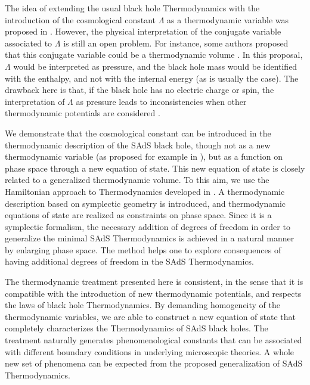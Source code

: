 \documentclass[prd,onecolumn,notitlepage,amsmath,nofootinbib,superscriptaddress,showpacs,showkeys]{revtex4-1}
\begin{document}
\newpage

The idea of extending the usual black hole Thermodynamics with the
introduction of the cosmological constant $\Lambda$ as a thermodynamic
variable was proposed in \cite{21,seki2006,29}. However, the physical
interpretation of the conjugate variable associated to $\Lambda$
is still an open problem. For instance, some authors proposed that
this conjugate variable could be a thermodynamic volume \cite{kastor2009,Dol1,2011}.
In this proposal, $\Lambda$ would be interpreted as pressure, and
the black hole mass would be identified with the enthalpy, and not
with the internal energy (as is usually the case). The drawback here
is that, if the black hole has no electric charge or spin, the interpretation
of $\Lambda$ as pressure leads to inconsistencies when other thermodynamic
potentials are considered \cite{seki2006,Dol1,KubMan2012}.

We demonstrate that the cosmological constant can be introduced in
the thermodynamic description of the SAdS black hole, though not as
a new thermodynamic variable (as proposed for example in \cite{21,seki2006,29}),
but as a function on phase space through a new equation of state.
This new equation of state is closely related to a generalized thermodynamic
volume. To this aim, we use the Hamiltonian approach to Thermodynamics
developed in \cite{baldfresmol2016}. A thermodynamic description
based on symplectic geometry is introduced, and thermodynamic equations
of state are realized as constraints on phase space. Since it is a
symplectic formalism, the necessary addition of degrees of freedom
in order to generalize the minimal SAdS Thermodynamics is achieved
in a natural manner by enlarging phase space. The method helps
one to explore consequences of having additional degrees of freedom in the SAdS Thermodynamics.

The thermodynamic treatment presented here is consistent, in the sense
that it is compatible with the introduction of new thermodynamic potentials,
and respects the laws of black hole Thermodynamics. By demanding homogeneity
of the thermodynamic variables, we are able to construct a new equation
of state that completely characterizes the Thermodynamics of SAdS
black holes. The treatment naturally generates phenomenological constants
that can be associated with different boundary conditions in underlying
microscopic theories. A whole new set of phenomena can be expected
from the proposed generalization of SAdS Thermodynamics.
\end{document}

